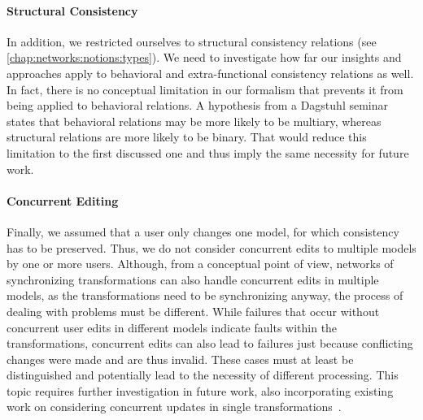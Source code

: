 \paragraph{Structural Consistency}
In addition, we restricted ourselves to structural consistency relations (see \autoref{chap:networks:notions:types}).
We need to investigate how far our insights and approaches apply to behavioral and extra-functional consistency relations as well.
In fact, there is no conceptual limitation in our formalism that prevents it from being applied to behavioral relations.
A hypothesis from a Dagstuhl seminar~\cite{cleve2019dagstuhl} states that behavioral relations may be more likely to be multiary, whereas structural relations are more likely to be binary.
That would reduce this limitation to the first discussed one and thus imply the same necessity for future work.

\paragraph{Concurrent Editing}
Finally, we assumed that a user only changes one model, for which consistency has to be preserved.
Thus, we do not consider concurrent edits to multiple models by one or more users.
Although, from a conceptual point of view, networks of synchronizing transformations can also handle concurrent edits in multiple models, as the transformations need to be synchronizing anyway, the process of dealing with problems must be different.
While failures that occur without concurrent user edits in different models indicate faults within the transformations, concurrent edits can also lead to failures just because conflicting changes were made and are thus invalid.
These cases must at least be distinguished and potentially lead to the necessity of different processing.
This topic requires further investigation in future work, also incorporating existing work on considering concurrent updates in single transformations~\cite{xiong2013SynchronizingConcurrentUpdates-SoSym,xiong2009parallelUpdates-ICMT}.


